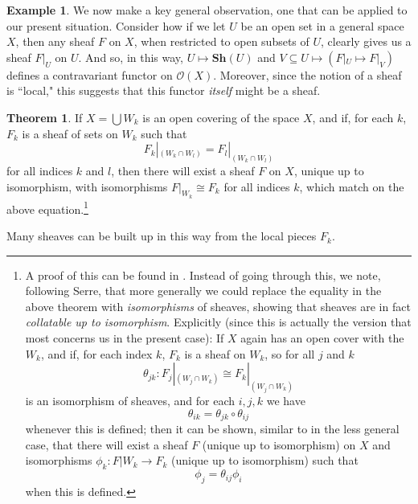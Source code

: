 \documentclass[a4paper]{book}
\theoremstyle{definition}
\newtheorem{example}{Example}[section]
\theoremstyle{definition}
\theoremstyle{definition}
\newtheorem{theorem}{Theorem}[section]
\theoremstyle{theorem}
\theoremstyle{definition}
\begin{document}
\begin{example}
		We now make a key general observation, one that can be applied to our present situation. Consider how if we let $U$ be an open set in a general space $X$, then any sheaf $F$ on $X$, when restricted to open subsets of $U$, clearly gives us a sheaf $F|_{U}$ on $U$. And so, in this way, $U \mapsto \textbf{Sh}(U)$ and $V \subseteq U \mapsto (F|_U \mapsto F|_V)$ defines a contravariant functor on $\mathscr{O}(X)$. Moreover, since the notion of a sheaf is ``local," this suggests that this functor \textit{itself} might be a sheaf.
		\begin{theorem}
			\label{sheafcollation} 
			If $X = \bigcup W_k$ is an open covering of the space $X$, and if, for each $k$, $F_k$ is a sheaf of sets on $W_k$ such that 
			\begin{equation}
			F_k|_{(W_k \cap W_l)} = F_l|_{(W_k \cap W_l)}
			\end{equation} 
			for all indices $k$ and $l$, then there will exist a sheaf $F$ on $X$, unique up to isomorphism, with isomorphisms $F|_{W_k} \cong F_k$ for all indices $k$, which match on the above equation.\footnote{A proof of this can be found in \cite{maclane_sheaves_1994}. Instead of going through this, we note, following Serre, that more generally we could replace the equality in the above theorem with \textit{isomorphisms} of sheaves, showing that sheaves are in fact \textit{collatable up to isomorphism}. Explicitly (since this is actually the version that most concerns us in the present case): If $X$ again has an open cover with the $W_k$, and if, for each index $k$, $F_k$ is a sheaf on $W_k$, so for all $j$ and $k$ 
				\begin{equation}
				\theta_{jk}: F_j|_{(W_j \cap W_k)} \cong F_k|_{(W_j \cap W_k)}
				\end{equation} 
				is an isomorphism of sheaves, and for each $i, j, k$ we have 
				\begin{equation*}
				\theta_{ik} = \theta_{jk} \circ \theta_{ij}
				\end{equation*}
				whenever this is defined; then it can be shown, similar to in the less general case, that there will exist a sheaf $F$ (unique up to isomorphism) on $X$ and isomorphisms $\phi_k: F|{W_k} \rightarrow F_k$ (unique up to isomorphism) such that 
				\begin{equation*}
				\phi_j = \theta_{ij} \phi_i
				\end{equation*}
				 when this is defined.}  
		\end{theorem} \noindent 
		Many sheaves can be built up in this way from the local pieces $F_k$. \par \noindent 

\end{example}
\end{document}
